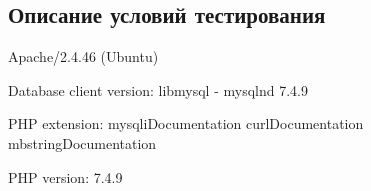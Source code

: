 \subsection{Описание условий тестирования}

Apache/2.4.46 (Ubuntu)

Database client version: libmysql - mysqlnd 7.4.9

PHP extension: mysqliDocumentation curlDocumentation mbstringDocumentation

PHP version: 7.4.9
